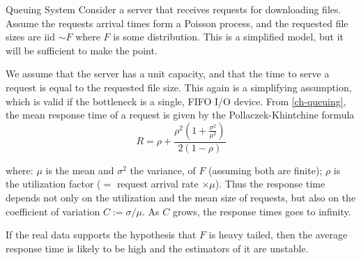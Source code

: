 \begin{figure}
\centering
 \label{fig-ht-rwp}
\end{figure}

\begin{ex}{Queuing System}
Consider a server that receives requests for
downloading files. Assume the requests arrival
times form a Poisson process, and the requested
file sizes are iid $\sim F$ where $F$ is some
distribution. This is a simplified model, but it
will be sufficient to make the point.

We assume that the server has a unit capacity,
and that the time to serve a request is equal to
the requested file size. This again is a
simplifying assumption, which is valid if the
bottleneck is a single, FIFO I/O device. From
\cref{ch-queuing}, the mean response time of a
request is given by the Pollaczek-Khintchine
formula
 $$
 R= \rho + \frac{\rho^2(1+\frac{\sigma^2}{\mu^2})}{2(1-\rho)}
 $$

where: $\mu$ is the mean and $\sigma^2$ the
variance, of $F$ (assuming both are finite);
$\rho$ is the utilization factor ($=$ request
arrival rate $\times \mu$). Thus the response
time depends not only on the utilization and the
mean size of requests, but also on the
coefficient of variation $C:=\sigma/\mu$. As $C$
grows, the response times goes to infinity.

If the real data supports the hypothesis that $F$
is heavy tailed, then the average response time
is likely to be high and the estimators of it are
unstable.
 \end{ex}
